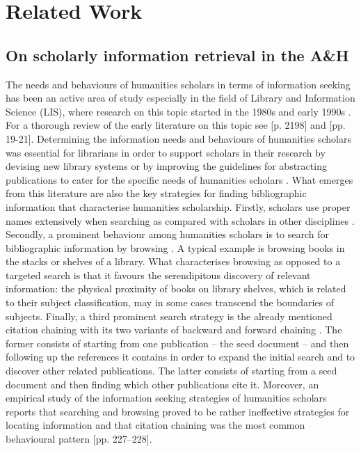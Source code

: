\section{Related Work}\label{sec:related-work}

\subsection{On scholarly information retrieval in the A\&H}\label{sec:scholarly-IR}

The needs and behaviours of humanities scholars in terms of information seeking has been an active area of study especially in the field of Library and Information Science (LIS), where research on this topic started in the 1980s and early 1990s \cite{stone_humanities_1982, ellis_behavioural_1989, watson-boone_information_1994}. For a thorough review of the early literature on this topic see \cite{wiberley_jr_humanities_2009}[p. 2198] and \cite{benardou_understanding_2010}[pp. 19-21].
Determining the information needs and behaviours of humanities scholars was essential for librarians in order to support scholars in their research by devising new library systems or by improving the guidelines for abstracting publications to cater for the specific needs of humanities
scholars \cite{tibbo_abstracting_1993}. What emerges from this literature are also the key strategies for finding bibliographic information that characterise humanities scholarship. Firstly, scholars use proper names extensively when searching as compared with scholars in other disciplines \cite{wiberley_patterns_1989, bates_getty_1996, palmer_scholarly_2009}. Secondly, a prominent behaviour among humanities scholars is to search for bibliographic information by browsing \cite{bates_getty_1996, ellis_behavioural_1989, meho_modeling_2003}. A typical example is browsing books in the stacks or shelves of a library. What characterises browsing as opposed to a targeted search is that it favours the serendipitous discovery of relevant information: the physical proximity of books on library shelves, which is related to their subject classification, may in some cases transcend the boundaries of subjects. Finally, a third prominent search strategy is the already mentioned citation chaining with its two variants of backward and forward chaining \cite{ellis_behavioural_1989,buchanan_information_2005}. The former consists of starting from one publication – the seed document -- and then following up the references it contains in order to expand the initial search and to discover other related publications. The latter consists of starting from a seed document and then finding which other publications cite it. Moreover, an empirical study of the information seeking strategies of humanities scholars reports that searching and browsing proved to be rather ineffective strategies for locating information and that citation chaining was the most common behavioural pattern \cite{buchanan_information_2005}[pp. 227–228].

